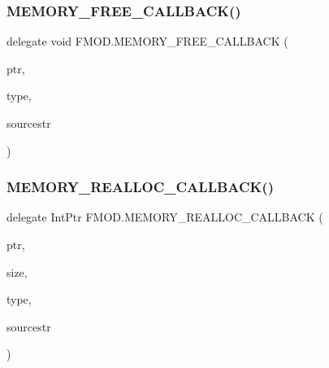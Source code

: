 \subsubsection{\texorpdfstring{M\+E\+M\+O\+R\+Y\+\_\+\+F\+R\+E\+E\+\_\+\+C\+A\+L\+L\+B\+A\+C\+K()}{MEMORY\_FREE\_CALLBACK()}}
{\footnotesize\ttfamily delegate void F\+M\+O\+D.\+M\+E\+M\+O\+R\+Y\+\_\+\+F\+R\+E\+E\+\_\+\+C\+A\+L\+L\+B\+A\+CK (\begin{DoxyParamCaption}\item[{Int\+Ptr}]{ptr,  }\item[{\hyperlink{namespace_f_m_o_d_a3eb4c9654cbf371b668f8eb46358e931}{M\+E\+M\+O\+R\+Y\+\_\+\+T\+Y\+PE}}]{type,  }\item[{\hyperlink{struct_f_m_o_d_1_1_string_wrapper}{String\+Wrapper}}]{sourcestr }\end{DoxyParamCaption})}

\mbox{\label{namespace_f_m_o_d_a3d035f4158c569e31902d9ad59ab43f0}} 
\subsubsection{\texorpdfstring{M\+E\+M\+O\+R\+Y\+\_\+\+R\+E\+A\+L\+L\+O\+C\+\_\+\+C\+A\+L\+L\+B\+A\+C\+K()}{MEMORY\_REALLOC\_CALLBACK()}}
{\footnotesize\ttfamily delegate Int\+Ptr F\+M\+O\+D.\+M\+E\+M\+O\+R\+Y\+\_\+\+R\+E\+A\+L\+L\+O\+C\+\_\+\+C\+A\+L\+L\+B\+A\+CK (\begin{DoxyParamCaption}\item[{Int\+Ptr}]{ptr,  }\item[{uint}]{size,  }\item[{\hyperlink{namespace_f_m_o_d_a3eb4c9654cbf371b668f8eb46358e931}{M\+E\+M\+O\+R\+Y\+\_\+\+T\+Y\+PE}}]{type,  }\item[{\hyperlink{struct_f_m_o_d_1_1_string_wrapper}{String\+Wrapper}}]{sourcestr }\end{DoxyParamCaption})}

\mbox{\label{namespace_f_m_o_d_abfb747f8aa8ba3087d69eeb201052f2c}} 

